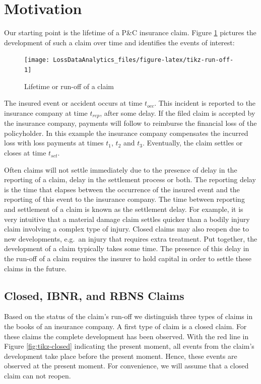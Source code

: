 \documentclass[]{book}
\begin{document}
\section{Motivation}\label{S:motivation}

Our starting point is the lifetime of a P\&C insurance claim. Figure
\ref{fig:tikz-run-off} pictures the development of such a claim over
time and identifies the events of interest:

\begin{figure}

{\centering \texttt{[image: LossDataAnalytics\_files/figure-latex/tikz-run-off-1]} 

}

\caption{Lifetime or run-off of a claim}\label{fig:tikz-run-off}
\end{figure}

The insured event or accident occurs at time \(t_{occ}\). This incident
is reported to the insurance company at time \(t_{rep}\), after some
delay. If the filed claim is accepted by the insurance company, payments
will follow to reimburse the financial loss of the policyholder. In this
example the insurance company compensates the incurred loss with loss
payments at times \(t_1\), \(t_2\) and \(t_3\). Eventually, the claim
settles or closes at time \(t_{set}\).

Often claims will not settle immediately due to the presence of delay in
the reporting of a claim, delay in the settlement process or both. The
reporting delay is the time that elapses between the occurrence of the
insured event and the reporting of this event to the insurance company.
The time between reporting and settlement of a claim is known as the
settlement delay. For example, it is very intuitive that a material
damage claim settles quicker than a bodily injury claim involving a
complex type of injury. Closed claims may also reopen due to new
developments, e.g.~an injury that requires extra treatment. Put
together, the development of a claim typically takes some time. The
presence of this delay in the run-off of a claim requires the insurer to
hold capital in order to settle these claims in the future.

\subsection{Closed, IBNR, and RBNS Claims}\label{S:claim-types}

Based on the status of the claim's run-off we distinguish three types of
claims in the books of an insurance company. A first type of claim is a
closed claim. For these claims the complete development has been
observed. With the red line in Figure \ref{fig:tikz-closed} indicating
the present moment, all events from the claim's development take place
before the present moment. Hence, these events are observed at the
present moment. For convenience, we will assume that a closed claim can
not reopen.
\end{document}
